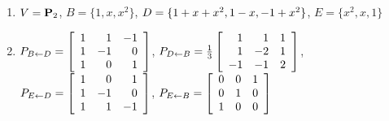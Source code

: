 \begin{multicols}{2}
\begin{ex}
\begin{enumerate}[label={\alph*.}]
\item $V = \textbf{P}_2$, $B = \{1, x, x^2\}$, $D = \{1 + x + x^2,\\  1 - x, -1 + x^2\}$, $E = \{x^2, x, 1\}$


\end{enumerate}
\begin{sol}
\begin{enumerate}[label={\alph*.}]
\setcounter{enumi}{1}
\item $P_{B \gets D} = \left[ \begin{array}{rrr} 1 & 1 & -1 \\ 1 & -1 & 0 \\ 1 & 0 & 1 \end{array} \right]$, $P_{D \gets B} = \tfrac{1}{3} \left[ \begin{array}{rrr} 1 & 1 & 1 \\ 1 & -2 & 1 \\ -1 & -1 & 2 \end{array} \right]$, $P_{E \gets D} = \left[ \begin{array}{rrr} 1 & 0 & 1 \\ 1 & -1 & 0 \\ 1 & 1 & -1 \end{array} \right]$, $P_{E \gets B} = \left[ \begin{array}{rrr} 0 & 0 & 1 \\ 0 & 1 & 0 \\ 1 & 0 & 0 \end{array} \right]$


\end{enumerate}
\end{sol}
\end{ex}


\end{multicols}
